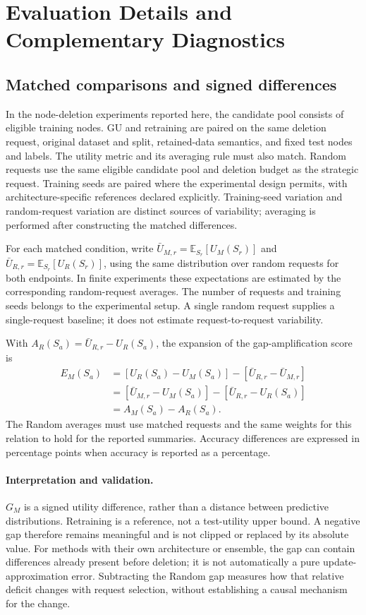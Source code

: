 \clearpage
\section{Evaluation Details and Complementary Diagnostics}
\label{app:evaluation-details}

\subsection{Matched comparisons and signed differences}
\label{app:matching}
In the node-deletion experiments reported here, the candidate pool consists of eligible training nodes. GU and retraining are paired on the same deletion request, original dataset and split, retained-data semantics, and fixed test nodes and labels. The utility metric and its averaging rule must also match. Random requests use the same eligible candidate pool and deletion budget as the strategic request. Training seeds are paired where the experimental design permits, with architecture-specific references declared explicitly. Training-seed variation and random-request variation are distinct sources of variability; averaging is performed after constructing the matched differences.

For each matched condition, write $\bar U_{M,r}=\mathbb E_{S_r}[U_M(S_r)]$ and $\bar U_{R,r}=\mathbb E_{S_r}[U_R(S_r)]$, using the same distribution over random requests for both endpoints. In finite experiments these expectations are estimated by the corresponding random-request averages. The number of requests and training seeds belongs to the experimental setup. A single random request supplies a single-request baseline; it does not estimate request-to-request variability.

With $A_R(S_a)=\bar U_{R,r}-U_R(S_a)$, the expansion of the gap-amplification score is
\begin{equation}
\begin{aligned}
E_M(S_a)
&=[U_R(S_a)-U_M(S_a)]-[\bar U_{R,r}-\bar U_{M,r}]\\
&=[\bar U_{M,r}-U_M(S_a)]-[\bar U_{R,r}-U_R(S_a)]\\
&=A_M(S_a)-A_R(S_a).
\end{aligned}
\end{equation}
The Random averages must use matched requests and the same weights for this relation to hold for the reported summaries. Accuracy differences are expressed in percentage points when accuracy is reported as a percentage.

\paragraph{Interpretation and validation.}
$G_M$ is a signed utility difference, rather than a distance between predictive distributions. Retraining is a reference, not a test-utility upper bound. A negative gap therefore remains meaningful and is not clipped or replaced by its absolute value. For methods with their own architecture or ensemble, the gap can contain differences already present before deletion; it is not automatically a pure update-approximation error. Subtracting the Random gap measures how that relative deficit changes with request selection, without establishing a causal mechanism for the change.

